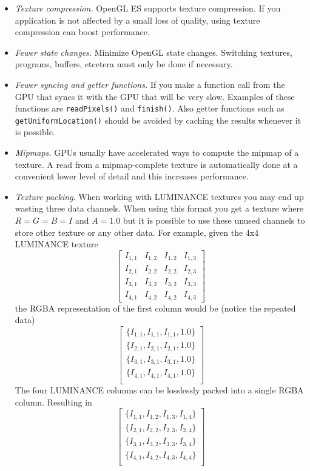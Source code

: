 \documentclass[conference]{IEEEtran}
\begin{document}
\begin{itemize}
\item \emph{Texture compression.} OpenGL ES supports texture compression. If you application is not affected by a small loss of quality, using texture compression can boost performance.
\item \emph{Fewer state changes.} Minimize OpenGL state changes. Switching textures, programs, buffers, etcetera must only be done if necessary.
\item \emph{Fewer syncing and getter functions.} If you make a function call from the GPU that syncs it with the GPU that will be very slow. Examples of these functions are \texttt{readPixels()} and \texttt{finish()}. Also getter functions such as \texttt{getUniformLocation()} should be avoided by caching the results whenever it is possible.
\item \emph{Mipmaps.} GPUs usually have accelerated ways to compute the mipmap of a texture. A read from a mipmap-complete texture is automatically done at a convenient lower level of detail and this increases performance.
\item \emph{Texture packing}. When working with LUMINANCE textures you may end up wasting three data channels. When using this format you get a texture where $R=G=B=I$ and $A=1.0$ but it is possible to use these unused channels to store other texture or any other data. For example, given the 4x4 LUMINANCE texture
\begin{equation*}
\label{eq:luminance}
\begin{bmatrix}
I_{1,1} & I_{1,2} & I_{1,2} & I_{1,3}\\ 
I_{2,1} & I_{2,2} & I_{2,2} & I_{2,3}\\ 
I_{3,1} & I_{3,2} & I_{3,2} & I_{3,3}\\ 
I_{4,1} & I_{4,2} & I_{4,2} & I_{4,3}
\end{bmatrix}
\end{equation*}
the RGBA representation of the first column would be (notice the repeated data)
\begin{equation*}
\label{eq:rgba}
\begin{bmatrix}
\{I_{1,1}, I_{1,1}, I_{1,1}, 1.0\}\\ 
\{I_{2,1}, I_{2,1}, I_{2,1}, 1.0\}\\ 
\{I_{3,1}, I_{3,1}, I_{3,1}, 1.0\}\\ 
\{I_{4,1}, I_{4,1}, I_{4,1}, 1.0\}\\ 
\end{bmatrix}
\end{equation*}
The four LUMINANCE columns can be losslessly packed into a single RGBA column. Resulting in 
\begin{equation*}
\label{eq:rgbapacked}
\begin{bmatrix}
\{I_{1,1}, I_{1,2}, I_{1,3}, I_{1,4}\}\\ 
\{I_{2,1}, I_{2,2}, I_{2,3}, I_{2,4}\}\\ 
\{I_{3,1}, I_{3,2}, I_{3,3}, I_{3,4}\}\\ 
\{I_{4,1}, I_{4,2}, I_{4,3}, I_{4,4}\}\\ 
\end{bmatrix}
\end{equation*}


\end{itemize}
\end{document}
